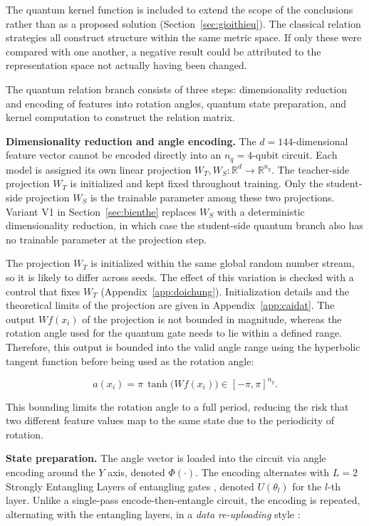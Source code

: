 The quantum kernel function is included to extend the scope of the
conclusions rather than as a proposed solution
(Section~\ref{sec:gioithieu}). The classical relation strategies all
construct structure within the same metric space. If only these were
compared with one another, a negative result could be attributed to
the representation space not actually having been changed.

The quantum relation branch consists of three steps: dimensionality
reduction and encoding of features into rotation angles, quantum
state preparation, and kernel computation to construct the relation
matrix.

\textbf{Dimensionality reduction and angle encoding.} The
$d = 144$-dimensional feature vector cannot be encoded directly into
an $n_q = 4$-qubit circuit. Each model is assigned its own linear
projection $W_T, W_S : \mathbb{R}^{d} \to \mathbb{R}^{n_q}$. The
teacher-side projection $W_T$ is initialized and kept fixed
throughout training. Only the student-side projection $W_S$ is the
trainable parameter among these two projections. Variant V1 in
Section~\ref{sec:bienthe} replaces $W_S$ with a deterministic
dimensionality reduction, in which case the student-side quantum
branch also has no trainable parameter at the projection step.

The projection $W_T$ is initialized within the same global random
number stream, so it is likely to differ across seeds. The effect of
this variation is checked with a control that fixes $W_T$
(Appendix~\ref{app:doichung}). Initialization details and the
theoretical limits of the projection are given in
Appendix~\ref{app:caidat}. The output $Wf(x_i)$ of the projection is
not bounded in magnitude, whereas the rotation angle used for the
quantum gate needs to lie within a defined range. Therefore, this
output is bounded into the valid angle range using the hyperbolic
tangent function before being used as the rotation angle:

\begin{equation}
\label{eq:angles}
a(x_i) = \pi \, \tanh\!\big( W f(x_i) \big) \in [-\pi, \pi]^{n_q}.
\end{equation}

This bounding limits the rotation angle to a full period, reducing
the risk that two different feature values map to the same state due
to the periodicity of rotation.

\textbf{State preparation.} The angle vector is loaded into the circuit via angle encoding around the $Y$ axis, denoted $\Phi(\cdot)$. The encoding alternates with $L = 2$ Strongly Entangling Layers of entangling gates \cite{schuld2020circuitcentric}, denoted $U(\theta_l)$ for the $l$-th layer. Unlike a single-pass encode-then-entangle circuit, the
encoding is repeated, alternating with the entangling layers, in a
\emph{data re-uploading} style \cite{perezsalinas2020data}:

